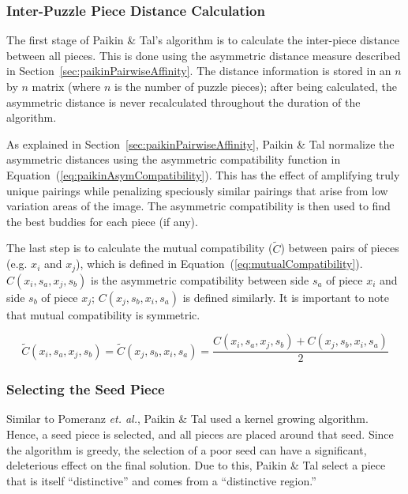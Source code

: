 \documentclass{report}
\def\eref#1{(\ref{#1})}
\begin{document}
\subsubsection{Inter-Puzzle Piece Distance Calculation}\label{sec:paikinTalInterPieceDistance}

The first stage of Paikin \& Tal's algorithm is to calculate the inter-piece distance between all pieces.  This is done using the asymmetric distance measure described in Section~\ref{sec:paikinPairwiseAffinity}.  The distance information is stored in an $n$ by $n$ matrix (where $n$ is the number of puzzle pieces); after being calculated, the asymmetric distance is never recalculated throughout the duration of the algorithm.

As explained in Section~\ref{sec:paikinPairwiseAffinity}, Paikin \& Tal normalize the asymmetric distances using the asymmetric compatibility function in Equation~\eref{eq:paikinAsymCompatibility}.  This has the effect of amplifying truly unique pairings while penalizing speciously similar pairings that arise from low variation areas of the image.  The asymmetric compatibility is then used to find the best buddies for each piece (if any).  

The last step is to calculate the mutual compatibility ($\tilde{C}$) between pairs of pieces (e.g. $x_i$ and $x_j$), which is defined in Equation~\eref{eq:mutualCompatibility}.  $C(x_i,s_a,x_j,s_b)$ is the asymmetric compatibility between side $s_a$ of piece $x_i$ and side $s_b$ of piece $x_j$; $C(x_j,s_b,x_i,s_a)$ is defined similarly.  It is important to note that mutual compatibility is symmetric.

\begin{equation} \label{eq:mutualCompatibility}
\tilde{C}(x_i,s_a,x_j,s_b)=\tilde{C}(x_j,s_b,x_i,s_a)=\frac{C(x_i,s_a,x_j,s_b) + C(x_j,s_b,x_i,s_a) }{2}
\end{equation}

\subsubsection{Selecting the Seed Piece}\label{sec:paikinTalSeedPiece}

Similar to Pomeranz \textit{et. al.}, Paikin \& Tal used a kernel growing algorithm.  Hence, a seed piece is selected, and all pieces are placed around that seed.    Since the algorithm is greedy, the selection of a poor seed can have a significant, deleterious effect on the final solution.  Due to this, Paikin \& Tal select a piece that is itself ``distinctive'' and comes from a ``distinctive region.''  
\end{document}
